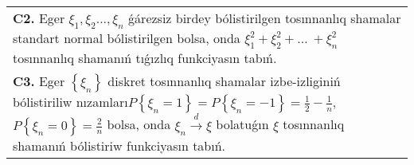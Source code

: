 \documentclass{article}
\begin{document}
\begin{tabular}{m{17cm}}
 \\
\textbf{C2.} Eger \(\xi_{1},\xi_{2}...,\xi_{n}\) ǵárezsiz birdey bólistirilgen tosınnanlıq shamalar standart normal bólistirilgen bolsa, onda \(\xi_{1}^{2} + \xi_{2}^{2} + ...\  + \xi_{n}^{2}\) tosınnanlıq shamanıń tıǵızlıq funkciyasın tabıń.
 \\
\textbf{C3.} Eger \(\left\{ \xi_{n} \right\}\) diskret tosınnanlıq shamalar izbe-izliginiń bólistiriliw nızamları\(P\left\{ \xi_{n} = 1 \right\} = P\left\{ \xi_{n} = - 1 \right\} = \frac{1}{2} - \frac{1}{n},\) \(P\left\{ \xi_{n} = 0 \right\} = \frac{2}{n}\) bolsa, onda \(\xi_{n}\overset{d}{\rightarrow}\xi\) bolatuǵın \(\xi\) tosınnanlıq shamanıń bólistiriw funkciyasın tabıń.
 \\

\end{tabular}
\vspace{1cm}
\end{document}
